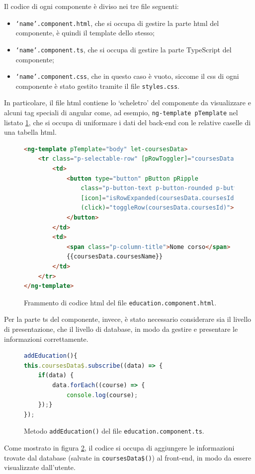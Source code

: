 Il codice di ogni componente è diviso nei tre file seguenti:
\begin{itemize}
  \item \texttt{`name'.component.html}, che si occupa di gestire la parte \acrshort{html} del componente, è quindi il template dello stesso;
  \item \texttt{`name'.component.ts}, che si occupa di gestire la parte TypeScript del componente;
  \item \texttt{`name'.component.css}, che in questo caso è vuoto, siccome il \acrshort{css} di ogni componente è stato gestito tramite il file \texttt{styles.css}.
\end{itemize}

In particolare, il file \acrshort{html} contiene lo `scheletro' del componente da visualizzare e alcuni tag speciali di \gls{angular} come, ad esempio, \texttt{ng-template pTemplate} nel listato \ref{fig:ptemplate}, che si occupa di uniformare i dati del back-end con le relative caselle di una tabella \acrshort{html}.

\begin{figure}[H]
\centering
\begin{lstlisting}[language=HTML]
 <ng-template pTemplate="body" let-coursesData>
    <tr class="p-selectable-row" [pRowToggler]="coursesData.coursesId">
        <td>
            <button type="button" pButton pRipple
                class="p-button-text p-button-rounded p-button-plain"
                [icon]="isRowExpanded(coursesData.coursesId) ? 'pi pi-chevron-down' : 'pi pi-chevron-right'"
                (click)="toggleRow(coursesData.coursesId)">
            </button>
        </td>
        <td>
            <span class="p-column-title">Nome corso</span>
            {{coursesData.coursesName}}
        </td>
    </tr>
</ng-template>
\end{lstlisting}
\caption{\label{fig:ptemplate}Frammento di codice \acrshort{html} del file \texttt{education.component.html}.}
\end{figure}

Per la parte \acrlong{ts} del componente, invece, è stato necessario considerare sia il livello di presentazione, che il livello di database, in modo da gestire e presentare le informazioni correttamente.
\begin{figure}[H]
\centering
\begin{lstlisting}[language=TypeScript]
addEducation(){
this.coursesData$.subscribe((data) => {
    if(data) {
        data.forEach((course) => {
            console.log(course);
    });}
});
\end{lstlisting}
\caption{\label{fig:education.ts}Metodo \texttt{addEducation()} del file \texttt{education.component.ts}.}
\end{figure}
Come mostrato in figura \ref{fig:education.ts}, il codice si occupa di aggiungere le informazioni trovate dal database (salvate in \texttt{coursesData\$()}) al front-end, in modo da essere visualizzate dall'utente.

